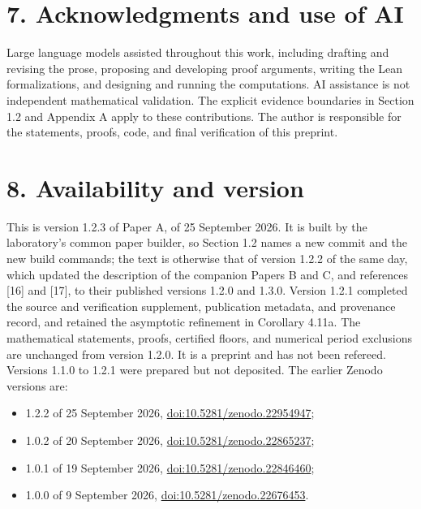 \documentclass[12pt]{article}
\providecommand{\tightlist}{\setlength{\itemsep}{0pt}\setlength{\parskip}{0pt}}
\begin{document}
\section{7. Acknowledgments and use of
AI}\label{acknowledgments-and-use-of-ai}

Large language models assisted throughout this work, including drafting
and revising the prose, proposing and developing proof arguments,
writing the Lean formalizations, and designing and running the
computations. AI assistance is not independent mathematical validation.
The explicit evidence boundaries in Section 1.2 and Appendix A apply to
these contributions. The author is responsible for the statements,
proofs, code, and final verification of this preprint.

\section{8. Availability and version}\label{availability-and-version}

This is version 1.2.3 of Paper A, of 25 September 2026. It is built by
the laboratory's common paper builder, so Section 1.2 names a new commit
and the new build commands; the text is otherwise that of version 1.2.2
of the same day, which updated the description of the companion Papers B
and C, and references {[}16{]} and {[}17{]}, to their published versions
1.2.0 and 1.3.0. Version 1.2.1 completed the source and verification
supplement, publication metadata, and provenance record, and retained
the asymptotic refinement in Corollary 4.11a. The mathematical
statements, proofs, certified floors, and numerical period exclusions
are unchanged from version 1.2.0. It is a preprint and has not been
refereed. Versions 1.1.0 to 1.2.1 were prepared but not deposited. The
earlier Zenodo versions are:

\begin{itemize}
\tightlist
\item
  1.2.2 of 25 September 2026,
  \href{https://doi.org/10.5281/zenodo.22954947}{doi:10.5281/zenodo.22954947};
\item
  1.0.2 of 20 September 2026,
  \href{https://doi.org/10.5281/zenodo.22865237}{doi:10.5281/zenodo.22865237};
\item
  1.0.1 of 19 September 2026,
  \href{https://doi.org/10.5281/zenodo.22846460}{doi:10.5281/zenodo.22846460};
\item
  1.0.0 of 9 September 2026,
  \href{https://doi.org/10.5281/zenodo.22676453}{doi:10.5281/zenodo.22676453}.
\end{itemize}
\end{document}
